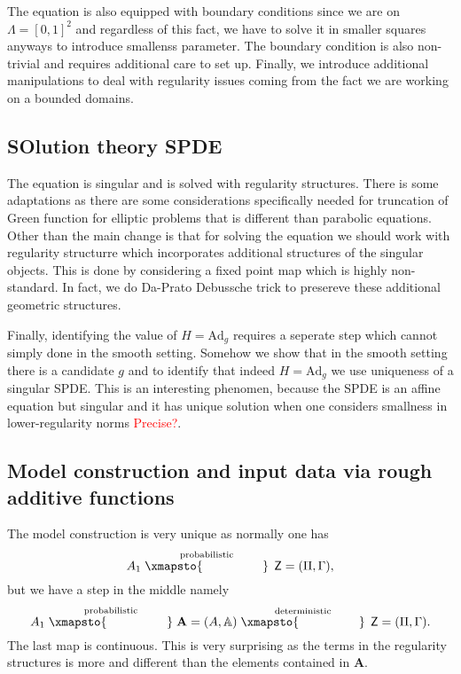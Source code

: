 \documentclass[12pt]{article}
\numberwithin{equation}{section}
\theoremstyle{definition}
\theoremstyle{remark}
\newcommand{\Ad}{\mathrm{Ad}}
\newcommand{\1}{\mathbf 1}
\newcommand{\<}{\langle}
\renewcommand{\>}{\rangle}
\newcommand{\red}[1]{\textcolor{red}{#1}}
\newcommand{\bfA}{\mathbf A}
\newcommand{\bA}{\mathbb A}
\newcommand{\sfZ}{\mathsf Z}
\begin{document}
The equation is also equipped with boundary conditions since we are on $\Lambda=[0,1]^2$ and regardless of this fact, we have to solve it in smaller squares anyways to introduce smallenss parameter. The boundary condition is also non-trivial and requires additional care to set up. Finally, we introduce additional manipulations to deal with regularity issues coming from the fact we are working on a bounded domains. 



\subsection{SOlution theory SPDE}
The equation is singular and is solved with regularity structures. There is some adaptations as there are some considerations specifically needed for truncation of Green function for elliptic problems that is different than parabolic equations. Other than the main change is that for solving the equation we should work with regularity structurre which incorporates additional structures of the singular objects. This is done by considering a fixed point map which is highly non-standard. In fact, we do Da-Prato Debussche trick to presereve these additional geometric structures. 

Finally, identifying the value of $H=\Ad_g$ requires a seperate step which cannot simply done in the smooth setting. Somehow we show that in the smooth setting there is a candidate $g$ and to identify that indeed $H=\Ad_g$ we use uniqueness of a singular SPDE. This is an interesting phenomen, because the SPDE is an affine equation but singular and it has unique solution when one considers smallness in lower-regularity norms \red{Precise?}. 


\subsection{Model construction and input data via rough additive functions}
The model construction is very unique as normally one has 
$$
A_1\stackrel{\text{probabilistic}}{\xmapsto{\hspace{1.7cm}}} \,\sfZ=(\Pi,\Gamma),
$$
but we have a step in the middle namely 
$$A_1\stackrel{\text{probabilistic}}{\xmapsto{\hspace{1.7cm}}} \bfA=(A,\bA) \stackrel{\text{deterministic}}{\xmapsto{\hspace{1.7cm}}} \,\sfZ=(\Pi,\Gamma).$$
The last map is continuous. This is very surprising as the terms in the regularity structures is more and different than the elements contained in $\bfA$. 
\end{document}
